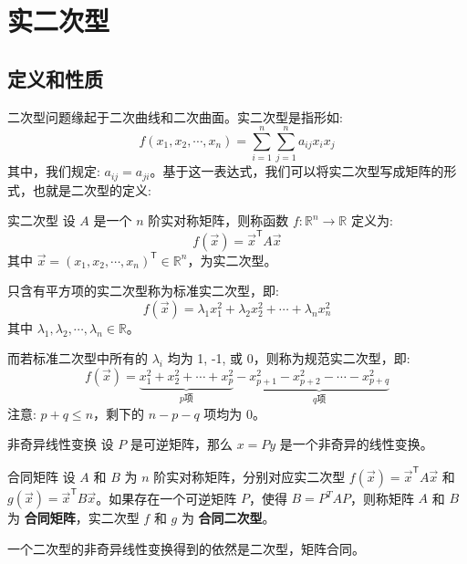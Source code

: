 \documentclass[a4paper,12pt]{ctexart}
\begin{document}
\section{实二次型}

\subsection{定义和性质}

二次型问题缘起于二次曲线和二次曲面。实二次型是指形如:
\[
f(x_1, x_2, \cdots, x_n) = \sum_{i=1}^n \sum_{j=1}^n a_{ij} x_i x_j
\]
其中，我们规定: $a_{ij} = a_{ji}$。基于这一表达式，我们可以将实二次型写成矩阵的形式，也就是二次型的定义:

\newpage

\begin{mydef}{实二次型}{}
    设 $A$ 是一个 $n$ 阶实对称矩阵，则称函数 $f: \mathbb{R}^n \to \mathbb{R}$ 定义为:
    \[
    f(\vec{x}) = \vec{x}^{\mathsf{T}} A \vec{x}
    \]
    其中 $\vec{x} = (x_1, x_2, \cdots, x_n)^{\mathsf{T}} \in \mathbb{R}^n$，为实二次型。
    
    只含有平方项的实二次型称为标准实二次型，即:
    \[
    f(\vec{x}) = \lambda_1 x_1^2 + \lambda_2 x_2^2 + \cdots + \lambda_n x_n^2
    \]
    其中 $\lambda_1, \lambda_2, \cdots, \lambda_n \in \mathbb{R}$。
    
    而若标准二次型中所有的 $\lambda_i$ 均为 1, -1, 或 0，则称为规范实二次型，即:
    \[
    f(\vec{x}) = \underbrace{x_1^2 + x_2^2 + \cdots + x_p^2}_{p\text{项}} - \underbrace{x_{p+1}^2 - x_{p+2}^2 - \cdots - x_{p+q}^2}_{q\text{项}}
    \]
    注意: $p+q \leq n$，剩下的 $n - p - q$ 项均为 0。
\end{mydef}

\begin{mydef}{非奇异线性变换}{}
    设 $P$ 是可逆矩阵，那么 $x=P y$ 是一个非奇异的线性变换。
\end{mydef}

\begin{mydef}{合同矩阵}{}
    设 $A$ 和 $B$ 为 $n$ 阶实对称矩阵，分别对应实二次型 $f(\vec{x}) = \vec{x}^{\mathsf{T}} A \vec{x}$ 和 $g(\vec{x}) = \vec{x}^{\mathsf{T}} B \vec{x}$。如果存在一个可逆矩阵 $P$，使得 $B = P^T A P$，则称矩阵 $A$ 和 $B$ 为 \textbf{合同矩阵}，实二次型 $f$ 和 $g$ 为 \textbf{合同二次型}。
\end{mydef}

\begin{mythm}{}{}
    一个二次型的非奇异线性变换得到的依然是二次型，矩阵合同。
\end{mythm}
\end{document}
